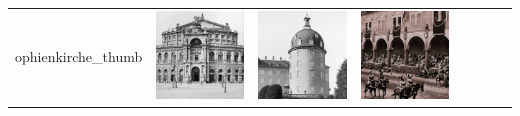 \begin{table}[]
{\begin{tabular}{cccccccc}
ophienkirche_thumb}&     \includegraphics[scale=1.4]{category_thumbs/semperoper_thumb}&\includegraphics[scale=1.4]{category_thumbs/moritzburg_thumb}&\includegraphics[scale=1.4]{category_thumbs/stallhof_thumb}                    \\

\end{tabular}}
\end{table}
